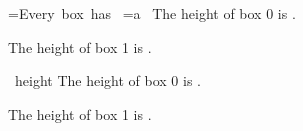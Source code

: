 =\hbox{Every box has }
=\hbox{a }
The height of box 0 is \the{}.\par
The height of box 1 is \the{}.\par
\hbox{ height}
The height of box 0 is \the{}.\par
The height of box 1 is \the{}.\par
\bye
